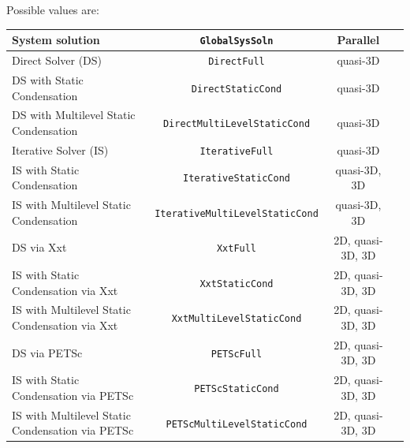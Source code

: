 \begin{itemize}
Possible values are:
%
\begin{center}
\footnotesize
\begin{tabular}{lccc}
\toprule
{System solution} & \texttt{GlobalSysSoln} &{Parallel}\\
\midrule
Direct Solver (DS)                               & \texttt{DirectFull}                    & quasi-3D \\
DS with Static Condensation                      & \texttt{DirectStaticCond}              & quasi-3D \\
DS with Multilevel Static Condensation           & \texttt{DirectMultiLevelStaticCond}    & quasi-3D \\
Iterative Solver (IS)                            & \texttt{IterativeFull}                 & quasi-3D \\
IS with Static Condensation                      & \texttt{IterativeStaticCond}           & quasi-3D, 3D \\
IS with Multilevel Static Condensation           & \texttt{IterativeMultiLevelStaticCond} & quasi-3D, 3D \\
DS via Xxt                                       & \texttt{XxtFull}                       & 2D, quasi-3D, 3D \\
IS with Static Condensation via Xxt              & \texttt{XxtStaticCond}                 & 2D, quasi-3D, 3D \\
IS with Multilevel Static Condensation via Xxt   & \texttt{XxtMultiLevelStaticCond}       & 2D, quasi-3D, 3D \\
DS via PETSc                                     & \texttt{PETScFull}                     & 2D, quasi-3D, 3D \\
IS with Static Condensation via PETSc            & \texttt{PETScStaticCond}               & 2D, quasi-3D, 3D \\
IS with Multilevel Static Condensation via PETSc & \texttt{PETScMultiLevelStaticCond}     & 2D, quasi-3D, 3D \\
\bottomrule
\end{tabular}
\end{center}


\end{itemize}
